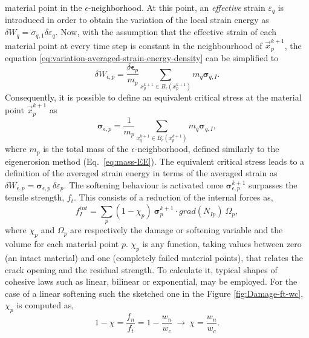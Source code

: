 \documentclass[preprint,12pt,a4paper]{elsarticle}
\newcommand{\tens}[1]{
  \ensuremath{\mathbf{{#1}}}
}
\newcommand\Grad[1]{grad({#1})}
\begin{document}
material point in the $\epsilon$-neighborhood. At this point, an \textit{effective} strain $\varepsilon_q$ is introduced in order to obtain the variation of
the local strain energy as $\delta W_q = \sigma_{q,1}
\delta\varepsilon_q$. Now, with the assumption that the effective
strain of each material point at every time step is constant in the
neighbourhood of $\vec{x}_p^{k+1}$, the equation 
\eqref{eq:variation-averaged-strain-energy-density} can be simplified
 to
\begin{equation}
  \label{eq:variation-averaged-strain-energy-density-simpli}
  \delta W_{\epsilon,p} =
  \frac{\delta \tens{\epsilon}_p}{m_p} \sum_{x_q^{k+1} \in
  B_{\epsilon}(x_p^{k+1})} m_q \tens{\sigma}_{q,I}. 
\end{equation}
Consequently, it is possible to define an equivalent critical stress at the
material point $\vec{x}_p^{k+1}$ as
\begin{equation}
  \label{eq:equivalent-critical-stress}
  \tens{\sigma}_{\epsilon,p} =
  \frac{1}{m_p} \sum_{x_q^{k+1} \in
  B_{\epsilon}(x_p^{k+1})} m_q \tens{\sigma}_{q,I}, 
\end{equation}
where $m_p$ is the total mass of the
$\epsilon$-neighborhood, defined similarly to the eigenerosion
  method (Eq.~\eqref{eq:mass-EE}). The equivalent critical stress
  leads to a definition of the   averaged strain energy in terms of the averaged
strain as $\delta W_{\epsilon,p} =
 \tens{\sigma}_{\epsilon,p}\ \delta\varepsilon_p$. The softening behaviour is
activated once $\tens{\sigma}_{\epsilon,p}^{k+1}$ surpasses the
tensile strength, $f_t$. This consists of a reduction of the internal
forces as, 
 \begin{equation}
   \label{eq:f-int-damaged}
   f^{int}_I = \sum_p (1 - \chi_p)\ \tens{\sigma}_{p}^{k+1} \cdot
   \Grad{N_{Ip}}\ \Omega_p,
 \end{equation}
where $\chi_p$ and $\Omega_p$ are respectively the damage or softening
variable and the volume for each material point $p$. $\chi_p$ is any function, taking
values between zero (an intact material) and one (completely failed
material points), that relates the crack opening and the residual strength. To calculate it, typical shapes of cohesive laws such as linear, bilinear or exponential, may be employed. For the case of a linear softening such the sketched one in the Figure \ref{fig:Damage-ft-wc}, $\chi_p$ is computed as,
 \begin{equation}
   \label{eq:damaged-variable-chi}
   1 - \chi = \frac{f_n}{f_t} = 1 - \frac{w_n}{w_c}\ \rightarrow\ \chi
   = \frac{w_n}{w_c}.
 \end{equation}
\end{document}
